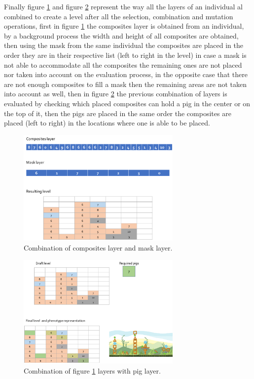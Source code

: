 \documentclass[conference]{IEEEtran}
\begin{document}
    
    Finally figure \ref{layer12_combine} and figure \ref{layer123_combine} represent 
    the way all the layers of an individual al combined to create a level after all 
    the selection, combination and mutation operations, first in figure \ref{layer12_combine}
    the composites layer is obtained from an individual, by a background process the 
    width and height of all composites are obtained, then using the mask from the same 
    individual the composites are placed in the order they are in their respective list 
    (left to right in the level) in case a mask is not able to accommodate all the 
    composites the remaining ones are not placed nor taken into account on the evaluation 
    process, in the opposite case that there are not enough composites to fill a mask 
    then the remaining areas are not taken into account as well, then in figure \ref{layer123_combine} 
    the previous combination of layers is evaluated by checking which placed composites 
    can hold a pig in the center or on the top of it, then the pigs are placed in the 
    same order the composites are placed (left to right) in the locations where one 
    is able to be placed.
    
    \begin{figure}[htbp]
        \centerline{\includegraphics[width=80mm]{Images/layer12_combine.png}}
        \caption{Combination of composites layer and mask layer.}
        \label{layer12_combine}
    \end{figure}
    
    \begin{figure}[htbp]
        \centerline{\includegraphics[width=80mm]{Images/layer123_combine.png}}
        \caption{Combination of figure \ref{layer12_combine} layers with pig layer.}
        \label{layer123_combine}
    \end{figure}
    
\end{document}
